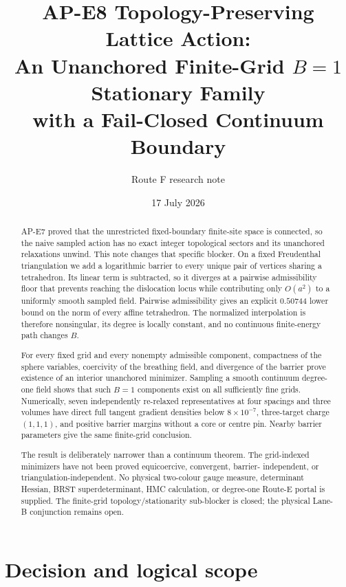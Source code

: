 \documentclass[11pt]{article}
\title{AP-E8 Topology-Preserving Lattice Action:\\
An Unanchored Finite-Grid \(B=1\) Stationary Family\\
with a Fail-Closed Continuum Boundary}
\author{Route F research note}
\date{17 July 2026}
\numberwithin{equation}{section}
\theoremstyle{definition}
\theoremstyle{remark}
\begin{document}
\maketitle

\begin{abstract}
AP-E7 proved that the unrestricted fixed-boundary finite-site space is
connected, so the naive sampled action has no exact integer topological
sectors and its unanchored relaxations unwind.  This note changes that
specific blocker.  On a fixed Freudenthal triangulation we add a logarithmic
barrier to every unique pair of vertices sharing a tetrahedron.  Its linear
term is subtracted, so it diverges at a pairwise admissibility floor that
prevents reaching the dislocation locus while contributing
only \(O(a^2)\) to a uniformly smooth sampled field.  Pairwise admissibility
gives an explicit \(0.50744\) lower bound on the norm of every affine
tetrahedron.  The normalized interpolation is therefore nonsingular, its
degree is locally constant, and no continuous finite-energy path changes
\(B\).

For every fixed grid and every nonempty admissible component, compactness of
the sphere variables, coercivity of the breathing field, and divergence of
the barrier prove existence of an interior unanchored minimizer.  Sampling a
smooth continuum degree-one field shows that such \(B=1\) components exist on
all sufficiently fine grids.  Numerically, seven independently re-relaxed
representatives at four spacings and three volumes have direct full tangent
gradient densities below \(8\times10^{-7}\), three-target charge
\((1,1,1)\), and positive barrier margins without a core or centre pin.
Nearby barrier parameters give the same finite-grid conclusion.

The result is deliberately narrower than a continuum theorem.  The
grid-indexed minimizers have not been proved equicoercive, convergent, barrier-
independent, or triangulation-independent.  No physical two-colour gauge
measure, determinant Hessian, BRST superdeterminant, HMC calculation, or
degree-one Route-E portal is supplied.  The finite-grid topology/stationarity
sub-blocker is closed; the physical Lane-B conjunction remains open.
\end{abstract}

\tableofcontents

\section{Decision and logical scope}
\end{document}
